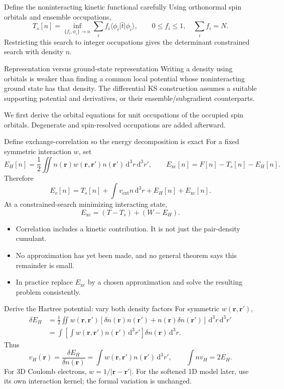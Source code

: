 \documentclass[aspectratio=169,10pt]{beamer}
\newcommand{\dd}{\,\mathrm d}
\newcommand{\rr}{\mathbf r}
\newcommand{\ket}[1]{\lvert #1\rangle}
\newcommand{\bra}[1]{\langle #1\rvert}
\newcommand{\ext}{\mathrm{ext}}
\newcommand{\xc}{\mathrm{xc}}
\begin{document}
\begin{frame}{Define the noninteracting kinetic functional carefully}
Using orthonormal spin orbitals and ensemble occupations,
\[
 \boxed{T_s[n]=\inf_{\{f_i,\phi_i\}\to n}
       \sum_i f_i\bra{\phi_i}\hat t\ket{\phi_i},}
 \qquad 0\leq f_i\leq1,\quad \sum_i f_i=N.
\]
Restricting this search to integer occupations gives the determinant
constrained search with density $n$.
\begin{block}{Representation versus ground-state representation}
Writing a density using orbitals is weaker than finding a common local
potential whose noninteracting ground state has that density.
The differential KS construction assumes a suitable supporting potential
and derivatives, or their ensemble/subgradient counterparts.
\end{block}
We first derive the orbital equations for unit occupations of the occupied
spin orbitals. Degenerate and spin-resolved occupations are added afterward.
\end{frame}

\begin{frame}{Define exchange-correlation so the energy decomposition is exact}
For a fixed symmetric interaction $w$, set
\[
 E_H[n]=\frac12\iint n(\rr)w(\rr,\rr')n(\rr')\dd^3r\dd^3r',
 \qquad \boxed{E_{\xc}[n]=F[n]-T_s[n]-E_H[n].}
\]
Therefore
\[
 \boxed{E_v[n]=T_s[n]+\int v_{\ext}n\dd^3r+E_H[n]+E_{\xc}[n].}
\]
At a constrained-search minimizing interacting state,
\[
 E_{\xc}=(T-T_s)+(W-E_H).
\]
\begin{itemize}
\item Correlation includes a kinetic contribution. It is not just the pair-density cumulant.
\item No approximation has yet been made, and no general theorem says this remainder is small.
\item In practice replace $E_{\xc}$ by a chosen approximation and solve the resulting problem consistently.
\end{itemize}
\end{frame}

\begin{frame}{Derive the Hartree potential: vary both density factors}
For symmetric $w(\rr,\rr')$,
\begin{align*}
 \delta E_H
 &=\frac12\iint w(\rr,\rr')
 [\delta n(\rr)n(\rr')+n(\rr)\delta n(\rr')]\dd^3r\dd^3r'\\
 &=\int\left[\int w(\rr,\rr')n(\rr')\dd^3r'\right]
                          \delta n(\rr)\dd^3r.
\end{align*}
Thus
\[
 \boxed{v_H(\rr)=\frac{\delta E_H}{\delta n(\rr)}
       =\int w(\rr,\rr')n(\rr')\dd^3r',}\qquad \int n v_H=2E_H.
\]
For 3D Coulomb electrons, $w=1/|\rr-\rr'|$. For the softened 1D model later,
use its own interaction kernel; the formal variation is unchanged.
\end{frame}
\end{document}
